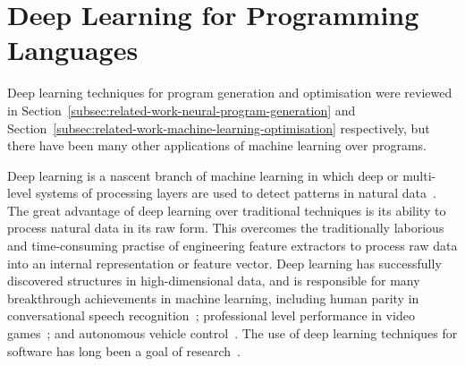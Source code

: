 \section{Deep Learning for Programming Languages}
\label{sec:related-work-other}

Deep learning techniques for program generation and optimisation were reviewed in Section~\ref{subsec:related-work-neural-program-generation} and Section~\ref{subsec:related-work-machine-learning-optimisation} respectively, but there have been many other applications of machine learning over programs.

Deep learning is a nascent branch of machine learning in which deep or multi-level systems of processing layers are used to detect patterns in natural data~\cite{LeCun2015,Wang2017}. The great advantage of deep learning over traditional techniques is its ability to process natural data in its raw form. This overcomes the traditionally laborious and time-consuming practise of engineering feature extractors to process raw data into an internal representation or feature vector. Deep learning has successfully discovered structures in high-dimensional data, and is responsible for many breakthrough achievements in machine learning, including human parity in conversational speech recognition~\cite{Xiong2016}; professional level performance in video games~\cite{Mnih2015}; and autonomous vehicle control~\cite{Lozano-Perez2012}. The use of deep learning techniques for software has long been a goal of research~\cite{White2015a}.

